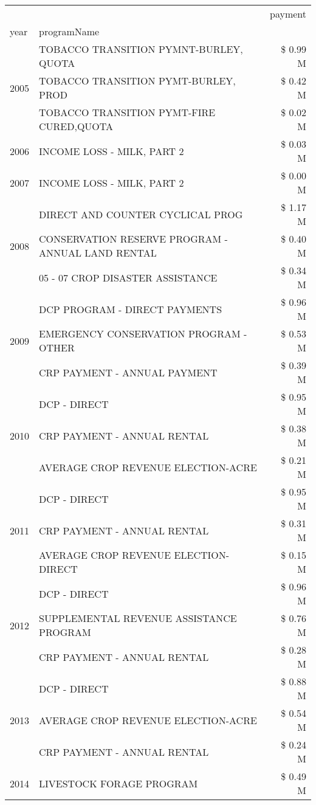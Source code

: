 \begin{tabular}{llr}
\toprule
 &  & payment \\
year & programName &  \\
\midrule
\multirow[t]{3}{*}{2005} & TOBACCO TRANSITION PYMNT-BURLEY, QUOTA & \$ 0.99 M \\
 & TOBACCO TRANSITION PYMT-BURLEY, PROD & \$ 0.42 M \\
 & TOBACCO TRANSITION PYMT-FIRE CURED,QUOTA & \$ 0.02 M \\
\cline{1-3}
2006 & INCOME LOSS - MILK, PART 2 & \$ 0.03 M \\
\cline{1-3}
2007 & INCOME LOSS - MILK, PART 2 & \$ 0.00 M \\
\cline{1-3}
\multirow[t]{3}{*}{2008} & DIRECT AND COUNTER CYCLICAL PROG & \$ 1.17 M \\
 & CONSERVATION RESERVE PROGRAM - ANNUAL LAND RENTAL & \$ 0.40 M \\
 & 05 - 07 CROP DISASTER ASSISTANCE & \$ 0.34 M \\
\cline{1-3}
\multirow[t]{3}{*}{2009} & DCP PROGRAM - DIRECT PAYMENTS & \$ 0.96 M \\
 & EMERGENCY CONSERVATION PROGRAM - OTHER & \$ 0.53 M \\
 & CRP PAYMENT - ANNUAL PAYMENT & \$ 0.39 M \\
\cline{1-3}
\multirow[t]{3}{*}{2010} & DCP - DIRECT & \$ 0.95 M \\
 & CRP PAYMENT - ANNUAL RENTAL & \$ 0.38 M \\
 & AVERAGE CROP REVENUE ELECTION-ACRE & \$ 0.21 M \\
\cline{1-3}
\multirow[t]{3}{*}{2011} & DCP - DIRECT & \$ 0.95 M \\
 & CRP PAYMENT - ANNUAL RENTAL & \$ 0.31 M \\
 & AVERAGE CROP REVENUE ELECTION-DIRECT & \$ 0.15 M \\
\cline{1-3}
\multirow[t]{3}{*}{2012} & DCP - DIRECT & \$ 0.96 M \\
 & SUPPLEMENTAL REVENUE ASSISTANCE PROGRAM & \$ 0.76 M \\
 & CRP PAYMENT - ANNUAL RENTAL & \$ 0.28 M \\
\cline{1-3}
\multirow[t]{3}{*}{2013} & DCP - DIRECT & \$ 0.88 M \\
 & AVERAGE CROP REVENUE ELECTION-ACRE & \$ 0.54 M \\
 & CRP PAYMENT - ANNUAL RENTAL & \$ 0.24 M \\
\cline{1-3}
\multirow[t]{3}{*}{2014} & LIVESTOCK FORAGE PROGRAM & \$ 0.49 M \\

\end{tabular}
